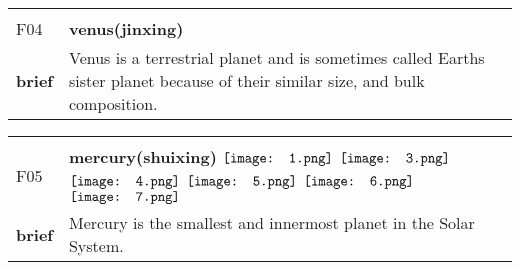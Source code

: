 \documentclass[UTF8]{article}
\begin{document}
            \begin{tabularx}{\textwidth}{p{1.5cm}X}
            \arrayrulecolor{myBlue}
        	\hline\\
            \small{F04}&
            \large{\bfseries{venus(jinxing)}}\hfill
                                                            \phantom{$\vcenter{\hbox{\texttt{[image: 1.png]}}}$}
                                                                \phantom{$\vcenter{\hbox{\texttt{[image: 2.png]}}}$}
                                                                \phantom{$\vcenter{\hbox{\texttt{[image: 3.png]}}}$}
                                                                \phantom{$\vcenter{\hbox{\texttt{[image: 4.png]}}}$}
                                                                \phantom{$\vcenter{\hbox{\texttt{[image: 5.png]}}}$}
                                                                \phantom{$\vcenter{\hbox{\texttt{[image: 6.png]}}}$}
                                                                \phantom{$\vcenter{\hbox{\texttt{[image: 7.png]}}}$}
                                        \\[10pt]
            \large{\bfseries{brief}}&\noindent\parbox[c]{\hsize}{Venus is a terrestrial planet and is sometimes called Earths sister planet because of their similar size, and bulk composition.} \\[5pt]
            \hline\\[-10pt]
        \end{tabularx}
            \begin{tabularx}{\textwidth}{p{1.5cm}X}
            \arrayrulecolor{myBlue}
        	\hline\\
            \small{F05}&
            \large{\bfseries{mercury(shuixing)}}\hfill
                                                            $\vcenter{\hbox{\texttt{[image: 1.png]}}}$
                                                                \phantom{$\vcenter{\hbox{\texttt{[image: 2.png]}}}$}
                                                                $\vcenter{\hbox{\texttt{[image: 3.png]}}}$
                                                                $\vcenter{\hbox{\texttt{[image: 4.png]}}}$
                                                                $\vcenter{\hbox{\texttt{[image: 5.png]}}}$
                                                                $\vcenter{\hbox{\texttt{[image: 6.png]}}}$
                                                                $\vcenter{\hbox{\texttt{[image: 7.png]}}}$
                                        \\[10pt]
            \large{\bfseries{brief}}&\noindent\parbox[c]{\hsize}{Mercury is the smallest and innermost planet in the Solar System.} \\[5pt]
            \hline\\[-10pt]
        \end{tabularx}
\end{document}
